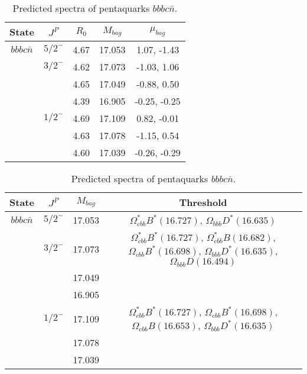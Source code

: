 \documentclass[prd,twocolumn,floatfix,nofootinbib]{revtex4}
\begin{document}
\renewcommand{\tabcolsep}{0.5cm}
\renewcommand{\arraystretch}{1.2}
\begin{table*}[!htbp]
    \caption{Predicted spectra of pentaquarks $bbbc\bar{n}$.}
    \begin{tabular}{ccccc}
        \hline\hline
        {\rm State} &$J^{P}$ &$R_{0}$ &$M_{bag}$ &$\mu_{bag}$ \\ \hline
        ${bbbc\bar{n}}$
            &${5/2}^{-}$    &4.67   &17.053 &1.07, -1.43 \\
            &${3/2}^{-}$    &4.62   &17.073 &-1.03, 1.06 \\
            &               &4.65   &17.049 &-0.88, 0.50 \\
            &               &4.39   &16.905 &-0.25, -0.25 \\
            &${1/2}^{-}$    &4.69   &17.109 &0.82, -0.01 \\
            &               &4.63   &17.078 &-1.15, 0.54 \\
            &               &4.60   &17.039 &-0.26, -0.29 \\
        \hline\hline
    \end{tabular}
\end{table*}

\renewcommand{\tabcolsep}{0.5cm}
\renewcommand{\arraystretch}{1.2}
\begin{table*}[!htbp]
    \caption{Predicted spectra of pentaquarks $bbbc\bar{n}$.}
    \begin{tabular}{cccc}
        \hline\hline
        {\rm State} &$J^{P}$ &$M_{bag}$ &Threshold \\ \hline
        ${bbbc\bar{n}}$
            &${5/2}^{-}$    &17.053 &$\Omega^{\ast}_{cbb} B^{\ast}(16.727)$, $\Omega_{bbb} D^{\ast}(16.635)$ \\
            &${3/2}^{-}$    &17.073 &$\Omega^{\ast}_{cbb} B^{\ast}(16.727)$, $\Omega^{\ast}_{cbb} B(16.682)$, $\Omega_{cbb} B^{\ast}(16.698)$, $\Omega_{bbb} D^{\ast}(16.635)$, $\Omega_{bbb} D(16.494)$ \\
            &               &17.049 & \\
            &               &16.905 & \\
            &${1/2}^{-}$    &17.109 &$\Omega^{\ast}_{cbb} B^{\ast}(16.727)$, $\Omega_{cbb} B^{\ast}(16.698)$, $\Omega_{cbb} B(16.653)$, $\Omega_{bbb} D^{\ast}(16.635)$ \\
            &               &17.078 & \\
            &               &17.039 & \\
        \hline\hline
    \end{tabular}
\end{table*}
\end{document}
